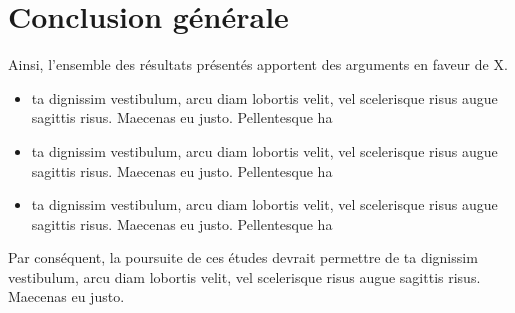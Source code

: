 \chapter*{Conclusion générale} %
 



\lipsum[40]

\lipsum[70]





\vspace{13pt}

Ainsi, l’ensemble des résultats présentés apportent des arguments en faveur de X.
\begin{itemize}[label=\textbullet]%
        \item ta dignissim vestibulum, arcu diam lobortis velit, vel scelerisque risus augue sagittis risus. Maecenas eu justo. Pellentesque ha
        \item ta dignissim vestibulum, arcu diam lobortis velit, vel scelerisque risus augue sagittis risus. Maecenas eu justo. Pellentesque ha
        \item ta dignissim vestibulum, arcu diam lobortis velit, vel scelerisque risus augue sagittis risus. Maecenas eu justo. Pellentesque ha
\end{itemize}

\vspace{13pt}

Par conséquent, la poursuite de ces études devrait permettre de ta dignissim vestibulum, arcu diam lobortis velit, vel scelerisque risus augue sagittis risus. Maecenas eu justo.

\lipsum[70]

\lipsum[70]

\lipsum[70]

\lipsum[70]

\lipsum[70]

\lipsum[70]

\lipsum[70]

\lipsum[70]

